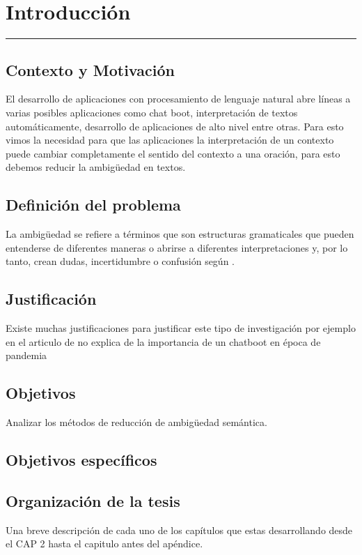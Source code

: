 \chapter{Introducción}
\hrule \bigskip \vspace*{1cm}
\section{Contexto y Motivación}
El desarrollo de aplicaciones con procesamiento de lenguaje natural abre líneas a varias posibles aplicaciones como chat boot, interpretación de textos automáticamente, desarrollo de aplicaciones de alto nivel entre otras. Para esto vimos la necesidad para que las aplicaciones la interpretación de un contexto puede cambiar completamente el sentido del contexto a una oración, para esto debemos reducir la ambigüedad en textos. 

\section{Definición del problema}
La ambigüedad se refiere a términos que son estructuras gramaticales que pueden entenderse de diferentes maneras o abrirse a diferentes interpretaciones y, por lo tanto, crean dudas, incertidumbre o confusión según \cite{EvaluacionAmbiguedad01}.



\section{Justificación}

Existe muchas justificaciones para justificar este tipo de investigación por ejemplo en el articulo de \cite{ChatBoot} no explica de la importancia de un chatboot en época de pandemia


\section{Objetivos}

 Analizar los métodos de reducción de ambigüedad semántica.

\section{Objetivos específicos}

\section{Organización de la tesis}

Una breve descripción de cada uno de los capítulos que estas
desarrollando desde el CAP 2 hasta el capitulo antes del apéndice.
